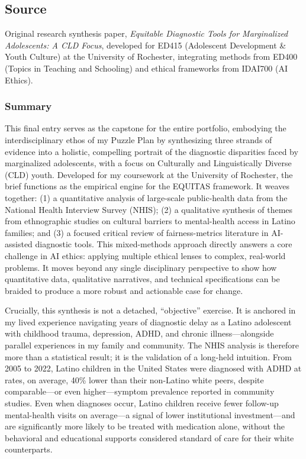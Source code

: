 \documentclass[11pt,twoside]{article}
\begin{document}
\vspace{-0.3cm}
\subsection*{Source}

\vspace{-0.3cm}
Original research synthesis paper, \textit{Equitable Diagnostic Tools for Marginalized Adolescents: A CLD Focus}, developed for ED415 (Adolescent Development \& Youth Culture) at the University of Rochester, integrating methods from ED400 (Topics in Teaching and Schooling) and ethical frameworks from IDAI700 (AI Ethics).

\vspace{-0.3cm}
\subsubsection*{Summary}

\vspace{-0.3cm}
This final entry serves as the capstone for the entire portfolio, embodying the interdisciplinary ethos of my Puzzle Plan by synthesizing three strands of evidence into a holistic, compelling portrait of the diagnostic disparities faced by marginalized adolescents, with a focus on Culturally and Linguistically Diverse (CLD) youth. Developed for my coursework at the University of Rochester, the brief functions as the empirical engine for the \textsc{EQUITAS} framework. It weaves together: (1) a quantitative analysis of large-scale public-health data from the National Health Interview Survey (NHIS); (2) a qualitative synthesis of themes from ethnographic studies on cultural barriers to mental-health access in Latino families; and (3) a focused critical review of fairness-metrics literature in AI-assisted diagnostic tools. This mixed-methods approach directly answers a core challenge in AI ethics: applying multiple ethical lenses to complex, real-world problems. It moves beyond any single disciplinary perspective to show how quantitative data, qualitative narratives, and technical specifications can be braided to produce a more robust and actionable case for change.

Crucially, this synthesis is not a detached, “objective” exercise. It is anchored in my lived experience navigating years of diagnostic delay as a Latino adolescent with childhood trauma, depression, ADHD, and chronic illness—alongside parallel experiences in my family and community. The NHIS analysis is therefore more than a statistical result; it is the validation of a long-held intuition. From 2005 to 2022, Latino children in the United States were diagnosed with ADHD at rates, on average, 40\% lower than their non-Latino white peers, despite comparable—or even higher—symptom prevalence reported in community studies. Even when diagnoses occur, Latino children receive fewer follow-up mental-health visits on average—a signal of lower institutional investment—and are significantly more likely to be treated with medication alone, without the behavioral and educational supports considered standard of care for their white counterparts.
\end{document}
